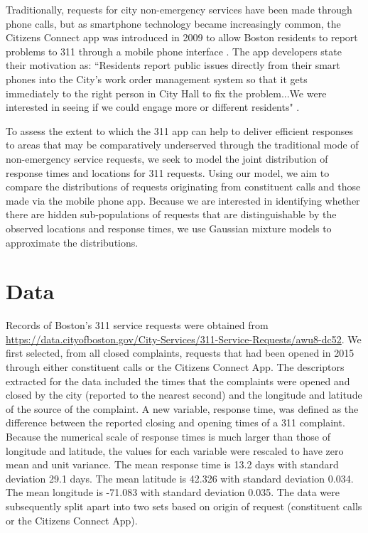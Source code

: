 \documentclass[twoside]{article}
\theoremstyle{theorem}
\theoremstyle{theorem}
\theoremstyle{theorem}
\theoremstyle{lemma}
\theoremstyle{definition}
\theoremstyle{example}
\begin{document}
Traditionally, requests for city non-emergency services have been made through phone calls, but as smartphone technology became increasingly common, the Citizens Connect app was introduced in 2009 to allow Boston residents to report problems to 311 through a mobile phone interface \cite{newurbanmechanics}. The app developers state their motivation as: ``Residents report public issues directly from their smart phones into the City's work order management system so that it gets immediately to the right person in City Hall to fix the problem...We were interested in seeing if we could engage more or different residents" \cite{newurbanmechanics}.  

To assess the extent to which the 311 app can help to deliver efficient responses to areas that may be comparatively underserved through the traditional mode of non-emergency service requests, we seek to model the joint distribution of response times and locations for 311 requests. Using our model, we aim to compare the distributions of requests originating from constituent calls and those made via the mobile phone app. Because we are interested in identifying whether there are hidden sub-populations of requests that are distinguishable by the observed locations and response times, we use Gaussian mixture models to approximate the distributions. 
\section{Data}
Records of Boston's 311 service requests were obtained from \url{https://data.cityofboston.gov/City-Services/311-Service-Requests/awu8-dc52}. We first selected, from all closed complaints, requests that had been opened in 2015 through either constituent calls or the Citizens Connect App. The descriptors extracted for the data included the times that the complaints were opened and closed by the city (reported to the nearest second) and the longitude and latitude of the source of the complaint. A new variable, response time, was defined as the difference between the reported closing and opening times of a 311 complaint. Because the numerical scale of response times is much larger than those of longitude and latitude, the values for each variable were rescaled to have zero mean and unit variance. The mean response time is 13.2 days with standard deviation 29.1 days. The mean latitude is 42.326 with standard deviation 0.034. The mean longitude is -71.083 with standard deviation 0.035. The data were subsequently split apart into two sets based on origin of request (constituent calls or the Citizens Connect App). 
\end{document}

